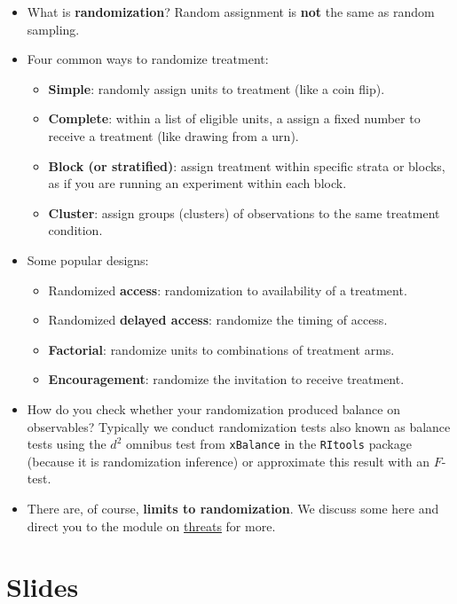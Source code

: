 \documentclass[12pt,]{book}
\begin{document}
\begin{itemize}
\item
  What is \textbf{randomization}? Random assignment is \textbf{not} the same as random sampling.
\item
  Four common ways to randomize treatment:

  \begin{itemize}
  \item
    \textbf{Simple}: randomly assign units to treatment (like a coin flip).
  \item
    \textbf{Complete}: within a list of eligible units, a assign a fixed number to receive a treatment (like drawing from a urn).
  \item
    \textbf{Block (or stratified)}: assign treatment within specific strata or blocks, as if you are running an experiment within each block.
  \item
    \textbf{Cluster}: assign groups (clusters) of observations to the same treatment condition.
  \end{itemize}
\item
  Some popular designs:

  \begin{itemize}
  \item
    Randomized \textbf{access}: randomization to availability of a treatment.
  \item
    Randomized \textbf{delayed access}: randomize the timing of access.
  \item
    \textbf{Factorial}: randomize units to combinations of treatment arms.
  \item
    \textbf{Encouragement}: randomize the invitation to receive treatment.
  \end{itemize}
\item
  How do you check whether your randomization produced balance on observables? Typically we conduct randomization tests also known as balance tests using the \(d^2\) omnibus test from \texttt{xBalance} in the \texttt{RItools} package (because it is randomization inference) or approximate this result with an \(F\)-test.
\item
  There are, of course, \textbf{limits to randomization}. We discuss some here and direct you to the module on \href{threats-to-internal-validity-of-randomized-experiments.html}{threats} for more.
\end{itemize}

\hypertarget{slides-2}{%
\section{Slides}\label{slides-2}}
\end{document}

